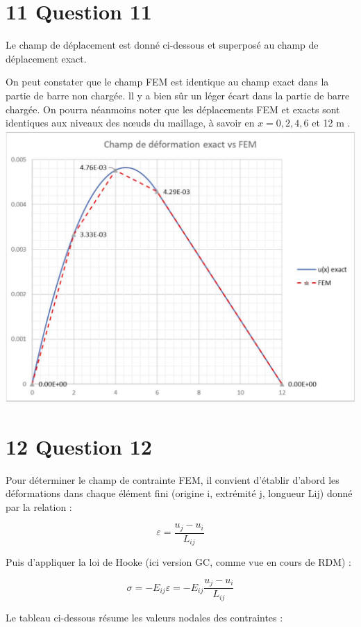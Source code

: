 \documentclass[11pt,a4paper]{report}
\begin{document}
{\section*{11 Question 11}
Le champ de déplacement est donné ci-dessous et superposé au champ de déplacement exact.

On peut constater que le champ FEM est identique au champ exact dans la partie de barre non chargée. ll y a bien sûr un léger écart dans la partie de barre chargée. On pourra néanmoins noter que les déplacements FEM et exacts sont identiques aux niveaux des nœuds du maillage, à savoir en $x=0,2,4,6$ et 12 m .\\
\includegraphics[max width=\textwidth, center]{2025_10_03_26e11264345fd9bad5cag-8}

\section*{12 Question 12}
Pour déterminer le champ de contrainte FEM, il convient d'établir d'abord les déformations dans chaque élément fini (origine i, extrémité j, longueur Lij) donné par la relation :

$$
\varepsilon=\frac{u_{j}-u_{i}}{L_{i j}}
$$

Puis d'appliquer la loi de Hooke (ici version GC, comme vue en cours de RDM) :

$$
\sigma=-E_{i j} \varepsilon=-E_{i j} \frac{u_{j}-u_{i}}{L_{i j}}
$$

Le tableau ci-dessous résume les valeurs nodales des contraintes :

}
\end{document}
